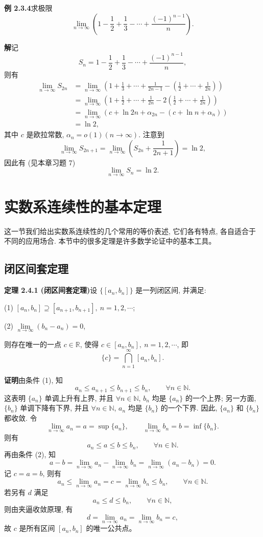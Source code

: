 \documentclass[UTF8, 12pt, fontset=fandol, oneside]{ctexart}
\begin{document}
\noindent\textbf{例 2.3.4}\quad 求极限
\[
  \lim_{n\to\infty}\left(1-\frac12+\frac13-\cdots+\frac{(-1)^{n-1}}n\right).
\]

\noindent\textbf{解}\quad 记
\[
  S_n=1-\frac12+\frac13-\cdots+\frac{(-1)^{n-1}}n,
\]
则有
\[
\begin{aligned}
  \lim_{n\to\infty}S_{2n}
  &=
  \lim_{n\to\infty}
  \left(1+\frac13+\cdots+\frac1{2n-1}
  -\left(\frac12+\cdots+\frac1{2n}\right)\right)\\
  &=
  \lim_{n\to\infty}
  \left(1+\frac12+\cdots+\frac1{2n}
  -2\left(\frac12+\cdots+\frac1{2n}\right)\right)\\
  &=
  \lim_{n\to\infty}
  \left(c+\ln2n+\alpha_{2n}-(c+\ln n+\alpha_n)\right)\\
  &=
  \ln2,
\end{aligned}
\]
其中 $c$ 是欧拉常数, $\alpha_n=o(1)(n\to\infty)$. 注意到
\[
  \lim_{n\to\infty}S_{2n+1}
  =
  \lim_{n\to\infty}\left(S_{2n}+\frac1{2n+1}\right)
  =
  \ln2,
\]
因此有 (见本章习题 7)
\[
  \lim_{n\to\infty}S_n=\ln2.
\]

\section{实数系连续性的基本定理}

这一节我们给出实数系连续性的几个常用的等价表述, 它们各有特点, 各自适合于不同的应用场合. 本节中的很多定理是许多数学论证中的基本工具。

\subsection{闭区间套定理}

\noindent\textbf{定理 2.4.1 (闭区间套定理)}\quad 设 $\{[a_n,b_n]\}$ 是一列闭区间, 并满足:

(1) $[a_n,b_n]\supseteq[a_{n+1},b_{n+1}],\ n=1,2,\cdots$;

(2) $\lim\limits_{n\to\infty}(b_n-a_n)=0$,

则存在唯一的一点 $c\in\mathbb{R}$, 使得 $c\in[a_n,b_n],\ n=1,2,\cdots$, 即
\[
  \{c\}=\bigcap_{n=1}^\infty [a_n,b_n].
\]

\noindent\textbf{证明}\quad 由条件 (1), 知
\[
  a_n\leqslant a_{n+1}\leqslant b_{n+1}\leqslant b_n,\qquad \forall n\in\mathbb{N}.
\]
这表明 $\{a_n\}$ 单调上升有上界, 并且 $\forall n\in\mathbb{N}$, $b_n$ 均是 $\{a_n\}$ 的一个上界; 另一方面, $\{b_n\}$ 单调下降有下界, 并且 $\forall n\in\mathbb{N}$, $a_n$ 均是 $\{b_n\}$ 的一个下界. 因此, $\{a_n\}$ 和 $\{b_n\}$ 都收敛. 令
\[
  \lim_{n\to\infty}a_n=a=\sup\{a_n\},\qquad
  \lim_{n\to\infty}b_n=b=\inf\{b_n\}.
\]
则有
\[
  a_n\leqslant a\leqslant b\leqslant b_n,\qquad \forall n\in\mathbb{N}.
\]
再由条件 (2), 知
\[
  a-b=\lim_{n\to\infty}a_n-\lim_{n\to\infty}b_n
  =
  \lim_{n\to\infty}(a_n-b_n)=0.
\]
记 $c=a=b$, 则有
\[
  a_n\leqslant\lim_{n\to\infty}a_n=c=\lim_{n\to\infty}b_n\leqslant b_n,\qquad \forall n\in\mathbb{N}.
\]
若另有 $d$ 满足
\[
  a_n\leqslant d\leqslant b_n,\qquad \forall n\in\mathbb{N},
\]
则由夹逼收敛原理, 有
\[
  d=\lim_{n\to\infty}a_n=\lim_{n\to\infty}b_n=c,
\]
故 $c$ 是所有区间 $[a_n,b_n]$ 的唯一公共点。
\end{document}
